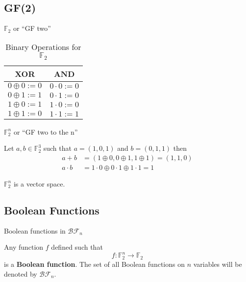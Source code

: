 \documentclass{beamer}
\def\gftwo{\mathbb{F}_2}
\def\BF{\mathcal{BF}}
\begin{document}
\subsection{GF(2)}
\begin{frame}{$\gftwo$ or ``GF two''}
  \begin{table}[h!]\label{tab:GF(2)}
    \centering
    \begin{tabular}{|c|c|}
      \hline
      XOR&AND\\
      \hline
      $0\oplus0:=0$&$0\cdot0:=0$\\
      $0\oplus1:=1$&$0\cdot1:=0$\\
      $1\oplus0:=1$&$1\cdot0:=0$\\
      $1\oplus1:=0$&$1\cdot1:=1$\\
      \hline
    \end{tabular}
  \caption{Binary Operations for $\gftwo$}
  \end{table}
\end{frame}

\begin{frame}{$\gftwo^n$ or ``GF two to the n''}
\begin{example}
  Let $a,b\in\gftwo^3$ such that $a=(1,0,1)$ and $b=(0,1,1)$ then
  \begin{align*}
    a+b      &=(1\oplus0,0\oplus1,1\oplus1)=(1,1,0) \\
  a\cdot b &=1\cdot0\oplus0\cdot1\oplus1\cdot1=1
  \end{align*}
\end{example}

\begin{fact}
  $\gftwo^n$ is a vector space.
\end{fact}
\end{frame}

\subsection{Boolean Functions}
\begin{frame}{Boolean functions in $\BF_n$}
  \begin{definition}
  \label{def:boolean-function}
    Any function $f$ defined such that 
    \begin{equation*}
      f:\gftwo^n\rightarrow\gftwo
    \end{equation*}
    is a {\bf Boolean function}. The set of all Boolean functions on $n$
    variables will be denoted by $\BF_n$.
  \end{definition}
\end{frame}
\end{document}
